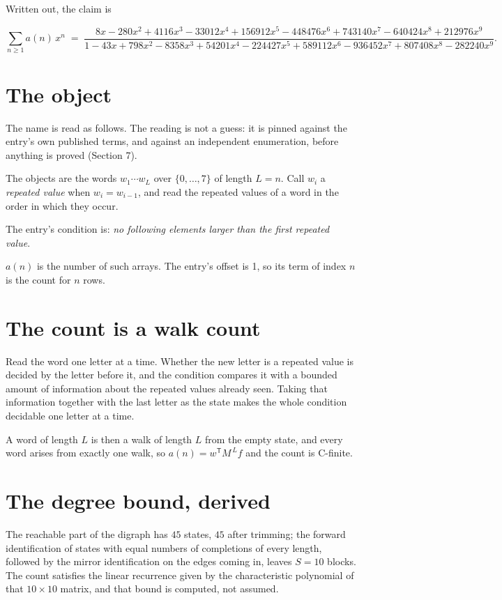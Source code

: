 \documentclass[11pt]{article}
\theoremstyle{definition}
\begin{document}
Written out, the claim is

\[\sum_{n \ge 1} a(n)\,x^n \;=\; \frac{8x - 280x^{2} + 4116x^{3} - 33012x^{4} + 156912x^{5} - 448476x^{6} + 743140x^{7} - 640424x^{8} + 212976x^{9}}{1 - 43x + 798x^{2} - 8358x^{3} + 54201x^{4} - 224427x^{5} + 589112x^{6} - 936452x^{7} + 807408x^{8} - 282240x^{9}}.\]

\section{The object}

The name is read as follows. The reading is not a guess: it is pinned against the entry's own published terms, and against an independent enumeration, before anything is proved (Section 7).

The objects are the words $w_1\cdots w_L$ over $\{0,\dots,7\}$ of length $L = n$. Call $w_i$ a {\itshape repeated value} when $w_i = w_{i-1}$, and read the repeated values of a word in the order in which they occur.

The entry's condition is: {\itshape no following elements larger than the first repeated value}.

$a(n)$ is the number of such arrays. The entry's offset is 1, so its term of index $n$ is the count for $n$ rows.

\section{The count is a walk count}

Read the word one letter at a time. Whether the new letter is a repeated value is decided by the letter before it, and the condition compares it with a bounded amount of information about the repeated values already seen. Taking that information together with the last letter as the state makes the whole condition decidable one letter at a time.

A word of length $L$ is then a walk of length $L$ from the empty state, and every word arises from exactly one walk, so $a(n) = w^{\mathsf T}M^{\,L}f$ and the count is C-finite.

\section{The degree bound, derived}

The reachable part of the digraph has $45$ states, $45$ after trimming; the forward identification of states with equal numbers of completions of every length, followed by the mirror identification on the edges coming in, leaves $S = 10$ blocks. The count satisfies the linear recurrence given by the characteristic polynomial of that $10\times10$ matrix, and that bound is computed, not assumed.
\end{document}
